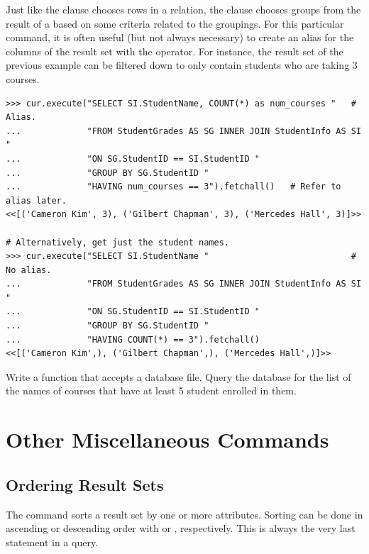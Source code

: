 Just like the  clause chooses rows in a relation, the  clause chooses groups from the result of a  based on some criteria related to the groupings.
For this particular command, it is often useful (but not always necessary) to create an alias for the columns of the result set with the  operator.
For instance, the result set of the previous example can be filtered down to only contain students who are taking 3 courses.

\begin{lstlisting}
>>> cur.execute("SELECT SI.StudentName, COUNT(*) as num_courses "   # Alias.
...             "FROM StudentGrades AS SG INNER JOIN StudentInfo AS SI "
...             "ON SG.StudentID == SI.StudentID "
...             "GROUP BY SG.StudentID "
...             "HAVING num_courses == 3").fetchall()   # Refer to alias later.
<<[('Cameron Kim', 3), ('Gilbert Chapman', 3), ('Mercedes Hall', 3)]>>

# Alternatively, get just the student names.
>>> cur.execute("SELECT SI.StudentName "                            # No alias.
...             "FROM StudentGrades AS SG INNER JOIN StudentInfo AS SI "
...             "ON SG.StudentID == SI.StudentID "
...             "GROUP BY SG.StudentID "
...             "HAVING COUNT(*) == 3").fetchall()
<<[('Cameron Kim',), ('Gilbert Chapman',), ('Mercedes Hall',)]>>
\end{lstlisting}

\begin{problem} %
Write a function that accepts a database file.
Query the database for the list of the names of courses that have at least 5 student enrolled in them.
\end{problem}

\section*{Other Miscellaneous Commands} %

\subsection*{Ordering Result Sets} %

The  command sorts a result set by one or more attributes.
Sorting can be done in ascending or descending order with  or , respectively.
This is always the very last statement in a query.


